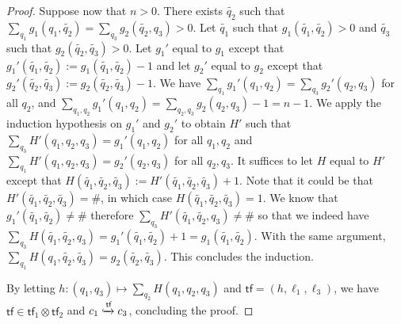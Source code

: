 \documentclass[10pt,a4paper]{article}
\newcommand{\deff}{:=}
\newcommand*{\abuchistate}{\ell}
\newcommand*{\controlloc}{\abuchistate}
\newcommand{\prodconfig}{c}
\newcommand*{\dummysymb}{\#}
\newcommand*{\atf}{\mathsf{tf}}
\newcommand*{\tftimes}{\otimes}
\newcommand*{\flowstep}[1]{\xhookrightarrow{#1}}
\begin{document}
\begin{appendixproof}
\begin{proof}
		Suppose now that \(n>0\).
		There exists \(\tilde{q_2}\) such that \(\sum_{q_1} g_1(q_1, \tilde{q_2}) = \sum_{q_3} g_2(\tilde{q_2},q_3)>0\).
		Let \(\tilde{q_1}\) such that \(g_1(\tilde{q_1}, \tilde{q_2})>0\) and \(\tilde{q_3}\) such that \(g_2(\tilde{q_2},\tilde{q_3})>0\).
		Let \(g_1'\) equal to \(g_1\) except that \(g_1'(\tilde{q_1}, \tilde{q_2}) \deff g_1(\tilde{q_1}, \tilde{q_2})-1\) and let \(g_2'\) equal to \(g_2\) except that \(g_2'(\tilde{q_2},\tilde{q_3}) \deff g_2(\tilde{q_2},\tilde{q_3})-1\).
		We have \(\sum_{q_1} g_1'(q_1,q_2) = \sum_{q_3} g_2'(q_2,q_3)\) for all \(q_2\), and \(\sum_{q_1,q_2} g_1'(q_1,q_2) = \sum_{q_2,q_3} g_2(q_2,q_3)-1 = n-1\).
		We apply the induction hypothesis on \(g_1'\) and \(g_2'\) to obtain \(H'\) such that \(\sum_{q_3} H'(q_1,q_2,q_3) = g_1'(q_1,q_2)\) for all \(q_1,q_2\) and \(\sum_{q_1} H'(q_1,q_2,q_3) = g_2'(q_2,q_3)\) for all \(q_2,q_3\).
		It suffices to let \(H\) equal to \(H'\) except that \(H(\tilde{q_1}, \tilde{q_2}, \tilde{q_3}) \deff H'(\tilde{q_1}, \tilde{q_2}, \tilde{q_3})+1\).
		Note that it could be that \(H'(\tilde{q_1}, \tilde{q_2}, \tilde{q_3}) = \dummysymb\), in which case \(H(\tilde{q_1}, \tilde{q_2}, \tilde{q_3}) = 1\).
		We know that \(g_1'(\tilde{q_1}, \tilde{q_2}) \ne \dummysymb\) therefore \(\sum_{q_3} H'(\tilde{q_1}, \tilde{q_2}, q_3) \ne \dummysymb\) so that we indeed have \(\sum_{q_3} H(\tilde{q_1}, \tilde{q_2}, q_3) = g_1'(\tilde{q_1}, \tilde{q_2})+1 = g_1(\tilde{q_1}, \tilde{q_2})\).
		With the same argument, \(\sum_{q_1} H(q_1, \tilde{q_2},\tilde{q_3}) = g_2(\tilde{q_2}, \tilde{q_3})\).
		This concludes the induction.

		By letting \(h : (q_1,q_3) \mapsto \sum_{q_2} H(q_1,q_2,q_3)\) and \(\atf = (h, \controlloc_1, \controlloc_3)\), we have \(\atf \in \atf_1 \tftimes \atf_2\) and \(\prodconfig_1 \flowstep{\atf} \prodconfig_3\), concluding the proof.
	\end{proof}


\end{appendixproof}
\end{document}
